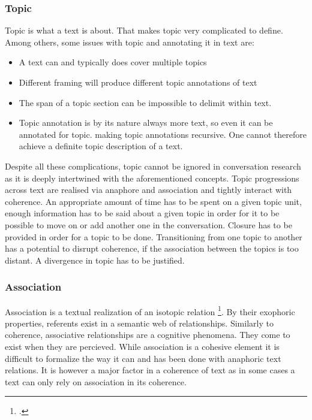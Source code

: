 \documentclass[12pt]{report}
\begin{document}
{\subsubsection{Topic}
\par
    Topic is what a text is about.
    That makes topic very complicated to define.
    Among others, some issues with topic and annotating it in text are:

\begin{itemize}
\item
A text can and typically does cover multiple topics
\item
Different framing will produce different topic annotations of text
\item
The span of a topic section can be impossible to delimit within text.
\item
Topic annotation is by its nature always more text,
            so even it can be annotated for topic.
            making topic annotations recursive.
            One cannot therefore achieve a definite topic description of a text.
\end{itemize}

\par
    Despite all these complications,
    topic cannot be ignored in conversation research
    as it is deeply intertwined with the aforementioned concepts.
    Topic progressions across text are realised via anaphore and association
    and tightly interact with coherence.
    An appropriate amount of time has to be spent on a given topic unit,
    enough information has to be said about a given topic
    in order for it to be possible to move on or add another one in the conversation.
    Closure has to be provided in order for a topic to be done.
    Transitioning from one topic to another has a potential to disrupt coherence,
    if the association between the topics is too distant.
    A divergence in topic has to be justified.

\subsubsection{Association}
\par
    Association is a textual realization of an isotopic relation \footcite{koblizek2015}.
    By their exophoric properties, referents exist in a semantic web of relationships.
    Similarly to coherence, associative relationships are a cognitive phenomena.
    They come to exist when they are percieved.
    While association is a cohesive element it is difficult to formalize
    the way it can and has been done with anaphoric text relations.
    It is however a major factor in a coherence of text as
    in some cases a text can only rely on association in its coherence.

}
\end{document}
